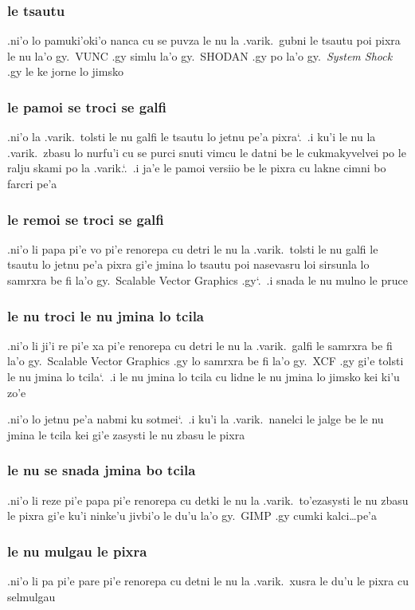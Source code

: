 \documentclass{report}
\newcommand\sds{\spacefactor\sfcode`.\ \space}
\begin{document}
\subsubsection{le tsautu}
.ni'o lo pamuki'oki'o nanca cu se puvza le nu la .varik.\ gubni le tsautu poi pixra le nu la'o gy.\ VUNC .gy simlu la'o gy.\ SHODAN .gy po la'o gy.\ \textit{System Shock} .gy le ke jorne lo jimsko

\subsubsection{le pamoi se troci se galfi}
.ni'o la .varik.\ tolsti le nu galfi le tsautu lo jetnu pe'a pixra\sds  .i ku'i le nu la .varik.\ zbasu lo nurfu'i cu se purci snuti vimcu le datni be le cukmakyvelvei po le ralju skami po la .varik.\sds  .i ja'e le pamoi versiio be le pixra cu lakne cimni bo farcri pe'a

\subsubsection{le remoi se troci se galfi}
.ni'o li papa pi'e vo pi'e renorepa cu detri le nu la .varik.\ tolsti le nu galfi le tsautu lo jetnu pe'a pixra gi'e jmina lo tsautu poi nasevasru loi sirsunla lo samrxra be fi la'o gy.\ Scalable Vector Graphics .gy\sds  .i snada le nu mulno le pruce

\subsubsection{le nu troci le nu jmina lo tcila}
.ni'o li ji'i re pi'e xa pi'e renorepa cu detri le nu la .varik.\ galfi le samrxra be fi la'o gy.\ Scalable Vector Graphics .gy lo samrxra be fi la'o gy.\ XCF .gy gi'e tolsti le nu jmina lo tcila\sds  .i le nu jmina lo tcila cu lidne le nu jmina lo jimsko kei ki'u zo'e

.ni'o lo jetnu pe'a nabmi ku sotmei\sds  .i ku'i la .varik.\ nanelci le jalge be le nu jmina le tcila kei gi'e zasysti le nu zbasu le pixra

\subsubsection{le nu se snada jmina bo tcila}
.ni'o li reze pi'e papa pi'e renorepa cu detki le nu la .varik.\ to'ezasysti le nu zbasu le pixra gi'e ku'i ninke'u jivbi'o le du'u la'o gy.\ GIMP .gy cumki kalci\ldots pe'a

\subsubsection{le nu mulgau le pixra}
.ni'o li pa pi'e pare pi'e renorepa cu detni le nu la .varik.\ xusra le du'u le pixra cu selmulgau
\end{document}
